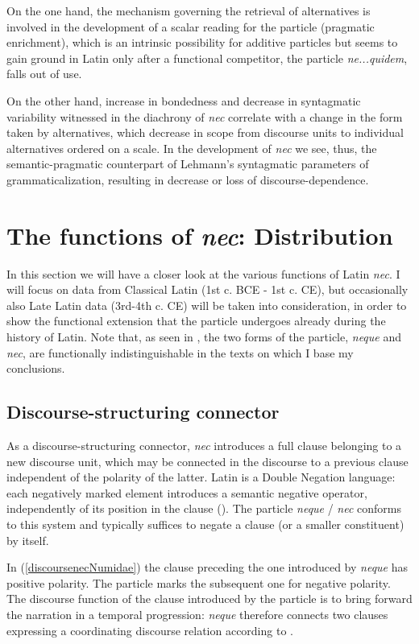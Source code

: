 \documentclass[output=paper,modfonts,nonflat,citecolor=brown,
showindex
]{langsci/langscibook}
\begin{document}
On the one hand, the mechanism governing the retrieval of alternatives is involved in the development of a scalar reading for the particle (pragmatic enrichment), which is an intrinsic possibility for additive particles but seems to gain ground in Latin only after a functional competitor, the particle {\emph{ne...quidem}}, falls out of use.

On the other hand, increase in bondedness and decrease in syntagmatic variability witnessed in the diachrony of {\emph{nec}} correlate with a change in the form taken by alternatives, which decrease in scope from discourse units to individual alternatives ordered on a scale. In the development of {\emph{nec}} we see, thus, the semantic-pragmatic counterpart of Lehmann's syntagmatic parameters of grammaticalization, resulting in decrease or loss of discourse-dependence.

\section{The functions of {\emph{nec}}: Distribution} \label{distributionfunctions}

In this section we will have a closer look at the various functions of Latin {\emph{nec}}. I will focus on data from Classical Latin (1st c. BCE - 1st c. CE), but occasionally also Late Latin data (3rd-4th c. CE) will be taken into consideration, in order to show the functional extension that the particle undergoes already during the history of Latin. Note that, as seen in , the two forms of the particle, {\emph{neque}} and {\emph{nec}}, are functionally indistinguishable in the texts on which I base my conclusions.

\subsection{Discourse-structuring connector}

As a discourse-structuring connector, {\emph{nec}} introduces a full clause belonging to a new discourse unit, which may be connected in the discourse to a previous clause independent of the polarity of the latter. Latin is a Double Negation language: each negatively marked element introduces a semantic negative operator, independently of its position in the clause (\citealt[]{Gianollo16}). The particle {\emph{neque}} / {\emph{nec}} conforms to this system and typically suffices to negate a clause (or a smaller constituent) by itself.

In (\ref{discoursenecNumidae}) the clause preceding the one introduced by {\emph{neque}} has positive polarity. The particle marks the subsequent one for negative polarity. The discourse function of the clause introduced by the particle is to bring forward the narration in a temporal progression: {\emph{neque}} therefore connects two clauses expressing a coordinating discourse relation according to \citet[]{Asher93}.
\end{document}
